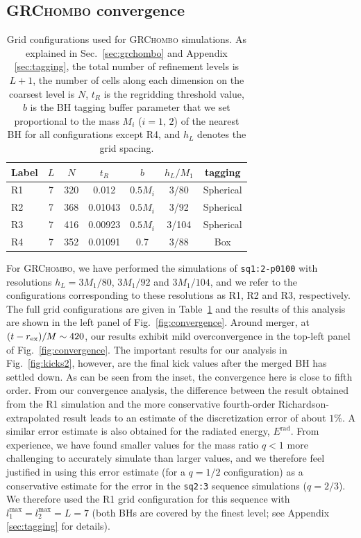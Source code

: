 \documentclass[floats,floatfix,showpacs,amssymb,physrev,twocolumn,superscriptaddress,reprint,
nofootinbib, longbibliography]{revtex4-2}
\newcommand{\rad}{\mathrm{rad}}
\begin{document}
\subsection{\textsc{GRChombo} convergence}
\begin{table}[b]
{   
    \caption{Grid configurations used for \textsc{GRChombo} simulations.
    As explained in Sec.~\ref{sec:grchombo} and Appendix \ref{sec:tagging},
    the total 
    number of refinement levels is $L+1$, the number of cells along each
    dimension on the coarsest level is $N$, $t_R$ is the regridding 
    threshold value, $b$ is the BH tagging buffer parameter
    that we
    set proportional to the mass $M_i$ ($i=1,\,2$)
    of the nearest BH for all configurations except R4, 
    and $h_L$ denotes the grid spacing.
    }
    \centering
    \begin{ruledtabular}
    \begin{tabular}{lcccccc}
        Label & $L$ & $N$ & $t_R$ & $b$ & $h_L/M_1$ & tagging\\
        \hline
        R1 & 7 & 320 & 0.012 & $0.5M_i$ & 3/80 & Spherical \\
        R2 & 7 & 368 & 0.01043 & $0.5M_i$ & 3/92 & Spherical\\
        R3 & 7 & 416 & 0.00923 & $0.5M_i$ & 3/104 & Spherical\\
        R4 & 7 & 352 & 0.01091 & 0.7 & 3/88 & Box\\
    \end{tabular}
    \end{ruledtabular}
}
    \label{tab:grchombo-grids}
\end{table}
For \textsc{GRChombo}, we have performed the simulations of 
\texttt{sq1:2-p0100} with resolutions $h_L=3M_1/80$, $3M_1/92$ and 
$3M_1/104$, and we refer to the configurations corresponding to these 
resolutions as R1, R2 and R3, respectively.
The full grid configurations 
are given in Table~\ref{tab:grchombo-grids} and the results of this 
analysis are shown in the left panel of Fig.~\ref{fig:convergence}. Around
merger, at $(t-r_{\rm ex})/M\sim 420$, our results exhibit mild
overconvergence
in the top-left panel of Fig.~\ref{fig:convergence}.
The important results for our analysis in Fig.~\ref{fig:kicks2},
however, are the final kick values after the merged BH has settled down.
As can be seen from the inset, the convergence here is close to 
fifth order. 
From our convergence 
analysis, the difference between the result obtained from the R1 simulation 
and the more conservative fourth-order Richardson-extrapolated result leads 
to an estimate of the discretization error of about $1\%$. A similar error 
estimate is also obtained for the radiated energy, $E^{\rad}$.
From experience, we have found smaller values for the mass ratio $q<1$ 
more challenging to accurately simulate than larger values, and we 
therefore feel justified in using this error estimate (for a $q=1/2$ 
configuration) as a conservative estimate for the error in the 
\texttt{sq2:3} sequence simulations ($q=2/3$). We therefore used the R1 grid
configuration for this sequence with  $l_1^{\max}=l_2^{\max}=L=7$ 
(both BHs are covered by 
the finest level; see Appendix \ref{sec:tagging} for details).
\end{document}
